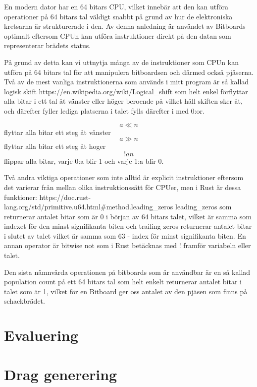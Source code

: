 \documentclass{article}
\begin{document}

En modern dator har en 64 bitars CPU, vilket innebär att den kan utföra operationer på 64 bitars tal väldigt snabbt på grund av hur de elektroniska kretsarna är strukturerade i den. Av denna anledning är användet av Bitboards optimalt eftersom CPUn kan utföra instruktioner direkt på den datan som representerar brädets status.

På grund av detta kan vi uttnytja många av de instruktioner som CPUn kan utföra på 64 bitars tal för att manipulera bitboardsen och därmed också pjäserna. Två av de mest vanliga instruktionerna som används i mitt program är så kallad logisk skift https://en.wikipedia.org/wiki/Logical_shift
som helt enkel förflyttar alla bitar i ett tal åt vänster eller höger beroende på vilket håll skiften sker åt, och därefter fyller lediga platserna i talet fylls därefter i med 0:or.

\[a \ll n\] flyttar alla bitar ett steg åt vänster
\[a \gg n\] flyttar alla bitar ett steg åt hoger
\[!a n\] flippar alla bitar, varje 0:a blir 1 och varje 1:a blir 0.

Två andra viktiga operationer som inte alltid är explicit instruktioner eftersom det varierar från mellan olika instruktionssätt för CPUer, men i Rust är dessa funktioner:
https://doc.rust-lang.org/std/primitive.u64.html#method.leading_zeros
leading_zeros som returnerar antalet bitar som är 0 i början av 64 bitars talet, vilket är samma som indexet för den minst signifikanta biten
och trailing zeros returnerar antalet bitar i slutet av talet vilket är samma som 63 - index för minst signifikanta biten. En annan operator är bitwise not som i Rust betäcknas med ! framför variabeln eller talet.

Den sista nämnvärda operationen på bitboards som är användbar är en så kallad population count på ett 64 bitars tal som helt enkelt returnerar antalet bitar i talet som är 1, vilket för en Bitboard ger oss antalet av den pjäsen som finns på schackbrädet.




\section{Evaluering}
\section{Drag generering}
\end{document}
